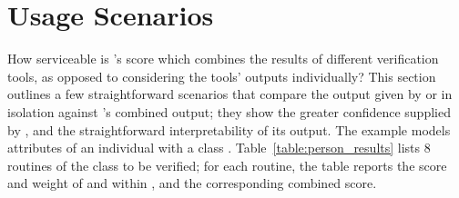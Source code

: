 \section{Usage Scenarios}


How serviceable is \EVE's score which combines the results of different verification tools, as opposed to considering the tools' outputs individually?
This section outlines a few straightforward scenarios that compare the output given by \AutoProof or \AutoTest in isolation against \EVE's combined output; they show the greater confidence supplied by \EVE, and the straightforward interpretability of its output.
%
The example models attributes of an individual with a class . Table~\ref{table:person_results} lists 8 routines of the class to be verified; for each routine, the table reports the score and weight of \AutoProof and \AutoTest within \EVE, and the corresponding combined score.

